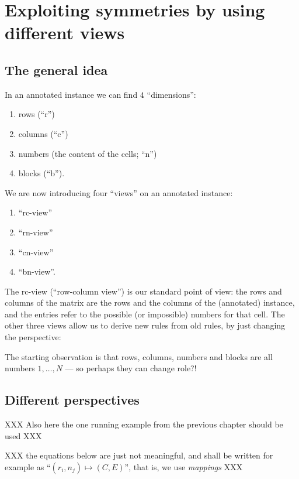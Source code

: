 \documentclass[11pt]{report}
\begin{document}
\chapter{Exploiting symmetries by using different views}
\label{cha:exploitingsymm}


\section{The general idea}
\label{sec:diffviewsidea}

In an annotated instance we can find $4$ ``dimensions'':
\begin{enumerate}
\item rows (``r'')
\item columns (``c'')
\item numbers (the content of the cells; ``n'')
\item blocks (``b'').
\end{enumerate}
We are now introducing four ``views'' on an annotated instance:
\begin{enumerate}
\item ``rc-view''
\item ``rn-view''
\item ``cn-view''
\item ``bn-view''.
\end{enumerate}
The rc-view (``row-column view'') is our standard point of view: the rows and columns of the matrix are the rows and the columns of the (annotated) instance, and the entries refer to the possible (or impossible) numbers for that cell. The other three views allow us to derive new rules from old rules, by just changing the perspective:
\begin{center}
The starting observation is that rows, columns, numbers and blocks are all numbers $1,\dots,N$ --- so perhaps they can change role?!
\end{center}




\section{Different  perspectives}
\label{sec:Differentperspectives}

XXX Also here the one running example from the previous chapter should be used XXX

XXX the equations below are just not meaningful, and shall be written for example as ``$(r_i,n_j) \mapsto (C,E)$'', that is, we use \emph{mappings} XXX
\end{document}
